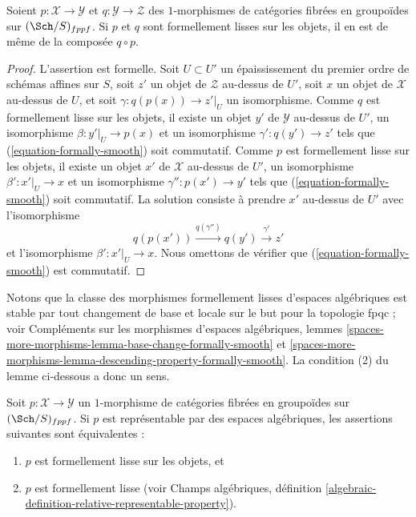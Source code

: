 \begin{lemma}
\label{lemma-composition-formally-smooth}
Soient $p : \mathcal{X} \to \mathcal{Y}$ et $q : \mathcal{Y} \to \mathcal{Z}$
des $1$-morphismes de catégories fibrées en groupoïdes sur $(\Sch/S)_{fppf}$.
Si $p$ et $q$ sont formellement lisses sur les objets, il en est de même de la composée
$q \circ p$.
\end{lemma}

\begin{proof}
L'assertion est formelle. Soit $U \subset U'$ un épaississement du premier ordre
de schémas affines sur $S$, soit $z'$ un objet de $\mathcal{Z}$
au-dessus de $U'$, soit $x$ un objet de $\mathcal{X}$ au-dessus de $U$,
et soit $\gamma : q(p(x)) \to z'|_U$ un isomorphisme. Comme $q$ est
formellement lisse sur les objets, il existe un objet
$y'$ de $\mathcal{Y}$ au-dessus de $U'$, un isomorphisme
$\beta : y'|_U \to p(x)$ et un isomorphisme $\gamma' : q(y') \to z'$
tels que (\ref{equation-formally-smooth}) soit commutatif. Comme $p$ est
formellement lisse sur les objets, il existe un objet
$x'$ de $\mathcal{X}$ au-dessus de $U'$, un isomorphisme
$\beta' : x'|_U \to x$ et un isomorphisme $\gamma'' : p(x') \to y'$
tels que (\ref{equation-formally-smooth}) soit commutatif.
La solution consiste à prendre $x'$ au-dessus de $U'$ avec l'isomorphisme
$$
q(p(x')) \xrightarrow{q(\gamma'')} q(y') \xrightarrow{\gamma'} z'
$$
et l'isomorphisme $\beta' : x'|_U \to x$. Nous omettons de vérifier
que (\ref{equation-formally-smooth}) est commutatif.
\end{proof}

\noindent
Notons que la classe des morphismes formellement lisses d'espaces algébriques est
stable par tout changement de base et locale sur le but pour la
topologie fpqc ; voir
Compléments sur les morphismes d'espaces algébriques,
lemmes \ref{spaces-more-morphisms-lemma-base-change-formally-smooth} et
\ref{spaces-more-morphisms-lemma-descending-property-formally-smooth}.
La condition (2) du lemme ci-dessous a donc un sens.

\begin{lemma}
\label{lemma-representable-by-spaces-formally-smooth}
Soit $p : \mathcal{X} \to \mathcal{Y}$ un $1$-morphisme de catégories
fibrées en groupoïdes sur $(\Sch/S)_{fppf}$. Si $p$ est
représentable par des espaces algébriques, les assertions suivantes sont équivalentes :
\begin{enumerate}
\item $p$ est formellement lisse sur les objets, et
\item $p$ est formellement lisse (voir
Champs algébriques,
définition \ref{algebraic-definition-relative-representable-property}).
\end{enumerate}
\end{lemma}


